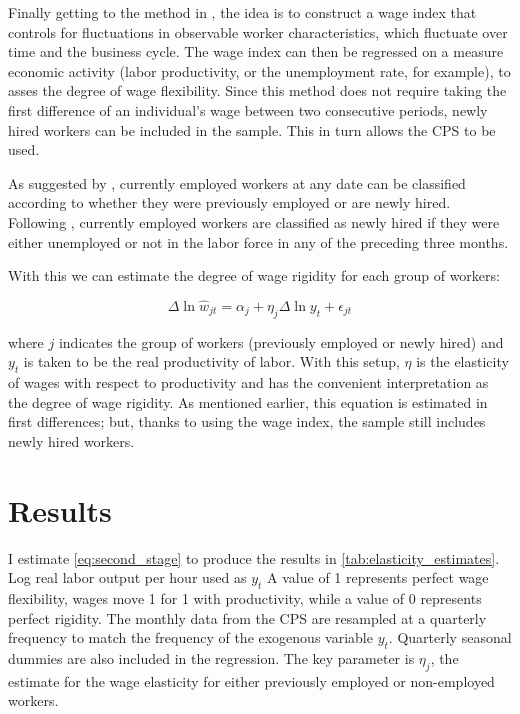 \documentclass[11pt]{article}
\begin{document}
Finally getting to the method in \cite{haefke_sonntag_vanRens_2013}, the idea is to construct a wage index that controls for fluctuations in observable worker characteristics,
which fluctuate over time and the business cycle.
The wage index can then be regressed on a measure economic activity (labor productivity, or the unemployment rate, for example), to asses the degree of wage flexibility.
Since this method does not require taking the first difference of an individual's wage between two consecutive periods, newly hired workers can be included in the sample.
This in turn allows the CPS to be used.

As suggested by \cite{pissarides_2009}, currently employed workers at any date can be classified according to whether they were previously employed or are newly hired.
Following \cite{haefke_sonntag_vanRens_2013}, currently employed workers are classified as newly hired if they were either unemployed or not in the labor force in any of the preceding three months.

With this we can estimate the degree of wage rigidity for each group of workers:

\begin{equation}
    \label{eq:second_stage}
    \Delta \ln \hat{w}_{jt} = \alpha_j + \eta_j \Delta \ln y_t + \epsilon_{jt}
\end{equation}

where $j$ indicates the group of workers (previously employed or newly hired) and $y_t$ is taken to be the real productivity of labor.
With this setup, $\eta$ is the elasticity of wages with respect to productivity and has the convenient interpretation as the degree of wage rigidity.
As mentioned earlier, this equation is estimated in first differences;
but, thanks to using the wage index, the sample still includes newly hired workers.

\section{Results}
\label{sec:results}

I estimate \autoref{eq:second_stage} to produce the results in \autoref{tab:elasticity_estimates}.
Log real labor output per hour used as $y_t$
A value of 1 represents perfect wage flexibility, wages move 1 for 1 with productivity, while a value of 0 represents perfect rigidity.
The monthly data from the CPS are resampled at a quarterly frequency to match the frequency of the exogenous variable $y_t$.
Quarterly seasonal dummies are also included in the regression.
The key parameter is $\eta_j$, the estimate for the wage elasticity for either previously employed or non-employed workers.
\end{document}
